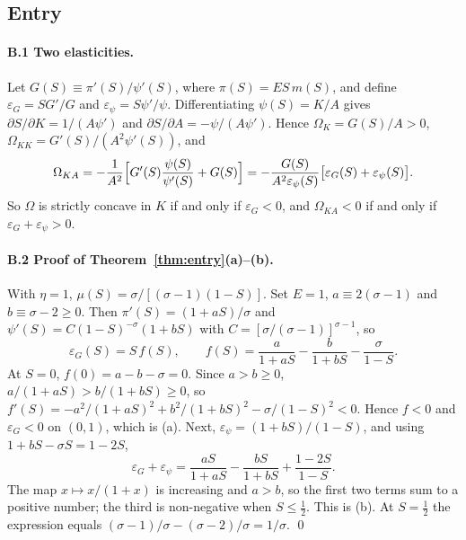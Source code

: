 \documentclass[11pt]{article}
\theoremstyle{definition}
\theoremstyle{remark}
\begin{document}
\subsection{Entry}
\label{app:entry}

\paragraph{B.1 Two elasticities.} Let $G(S)\equiv\pi'(S)/\psi'(S)$, where
$\pi(S)=ES\,m(S)$, and define $\varepsilon_G=SG'/G$ and $\varepsilon_\psi=S\psi'/\psi$.
Differentiating $\psi(S)=K/A$ gives $\partial S/\partial K=1/(A\psi')$ and
$\partial S/\partial A=-\psi/(A\psi')$. Hence $\Omega_K=G(S)/A>0$,
$\Omega_{KK}=G'(S)/(A^2\psi'(S))$, and
\[
  \Omega_{KA}=-\frac{1}{A^2}\Bigl[G'(S)\frac{\psi(S)}{\psi'(S)}+G(S)\Bigr]
  =-\frac{G(S)}{A^2\varepsilon_\psi(S)}\bigl[\varepsilon_G(S)+\varepsilon_\psi(S)\bigr].
\]
So $\Omega$ is strictly concave in $K$ if and only if $\varepsilon_G<0$, and
$\Omega_{KA}<0$ if and only if $\varepsilon_G+\varepsilon_\psi>0$.

\paragraph{B.2 Proof of Theorem~\ref{thm:entry}(a)--(b).} With $\eta=1$,
$\mu(S)=\sigma/[(\sigma-1)(1-S)]$. Set $E=1$, $a\equiv2(\sigma-1)$ and
$b\equiv\sigma-2\ge0$. Then $\pi'(S)=(1+aS)/\sigma$ and
$\psi'(S)=C(1-S)^{-\sigma}(1+bS)$ with $C=[\sigma/(\sigma-1)]^{\sigma-1}$, so
\[
  \varepsilon_G(S)=S\,f(S),\qquad
  f(S)=\frac{a}{1+aS}-\frac{b}{1+bS}-\frac{\sigma}{1-S}.
\]
At $S=0$, $f(0)=a-b-\sigma=0$. Since $a>b\ge0$, $a/(1+aS)>b/(1+bS)\ge0$, so
$f'(S)=-a^2/(1+aS)^2+b^2/(1+bS)^2-\sigma/(1-S)^2<0$. Hence $f<0$ and $\varepsilon_G<0$ on
$(0,1)$, which is (a). Next, $\varepsilon_\psi=(1+bS)/(1-S)$, and using
$1+bS-\sigma S=1-2S$,
\[
  \varepsilon_G+\varepsilon_\psi=\frac{aS}{1+aS}-\frac{bS}{1+bS}+\frac{1-2S}{1-S}.
\]
The map $x\mapsto x/(1+x)$ is increasing and $a>b$, so the first two terms sum to a
positive number; the third is non-negative when $S\le\frac12$. This is (b). At
$S=\frac12$ the expression equals $(\sigma-1)/\sigma-(\sigma-2)/\sigma=1/\sigma$. \qed
\end{document}
